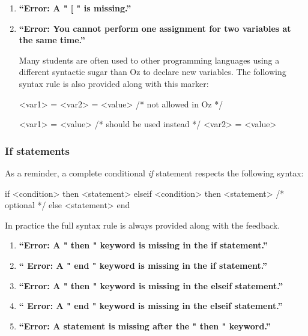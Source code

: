 \documentclass[11pt,a4paper,twoside,openright]{report}
\begin{document}
\begin{enumerate}
\item \textbf{\enquote{Error: A " [ " is missing.}}

\item \textbf{\enquote{Error: You cannot perform one assignment for two variables 
at the same time.}}

Many students are often used to other programming languages using a different 
syntactic sugar than Oz to declare new variables. The following syntax rule is 
also provided along with this marker:

\begin{OZ}
  <var1> = <var2> = <value>     /* not allowed in Oz */

  <var1> = <value>              /* should be used instead */
  <var2> = <value>
\end{OZ}
\end{enumerate}

\subsubsection{If statements}

As a reminder, a complete conditional \textit{if} statement respects the 
following syntax:

\begin{OZ}
  if <condition> then <statement>
  elseif <condition> then <statement>	/* optional */
  else <statement>
  end
\end{OZ}

In practice the full syntax rule is always provided along with the feedback.

\begin{enumerate}

\item \textbf{\enquote{Error: A " then " keyword is missing in the if statement.}}

\item \textbf{\enquote{ Error: A " end " keyword is missing in the if statement.}}

\item \textbf{\enquote{Error: A " then " keyword is missing in the elseif 
statement.}}

\item \textbf{\enquote{ Error: A " end " keyword is missing in the elseif statement.}}

\item \textbf{\enquote{Error: A statement is missing after the " then " keyword.}}

\end{enumerate}
\end{document}
